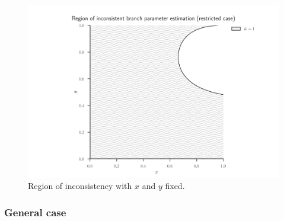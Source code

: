 \documentclass{article}
\begin{document}
\begin{figure}
\centering
\includegraphics[width=.9\textwidth]{branch-length-inconsistency-inkscape}
\caption{Region of inconsistency with $x$ and $y$ fixed.}
\label{fig:bl-inconsistency}
\end{figure}

\subsubsection*{General case}
\end{document}
